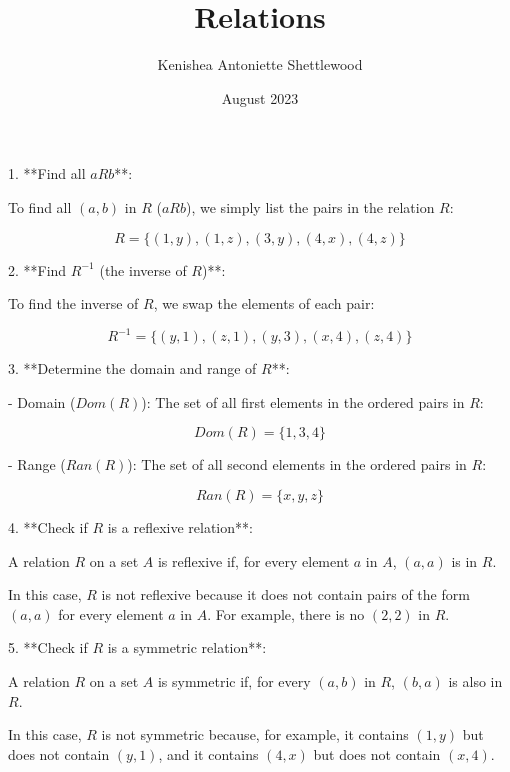 \documentclass{article}
\title{Relations}
\author{Kenishea Antoniette Shettlewood}
\date{August 2023}
\begin{document}
\maketitle

1. **Find all \(a R b\)**:
   
   To find all \((a, b)\) in \(R\) (\(aRb\)), we simply list the pairs in the relation \(R\):

   \[
   R = \{(1, y), (1, z), (3, y), (4, x), (4, z)\}
   \]

2. **Find \(R^{-1}\) (the inverse of \(R\))**:
   
   To find the inverse of \(R\), we swap the elements of each pair:

   \[
   R^{-1} = \{(y, 1), (z, 1), (y, 3), (x, 4), (z, 4)\}
   \]

3. **Determine the domain and range of \(R\)**:
   
   - Domain (\(Dom(R)\)): The set of all first elements in the ordered pairs in \(R\):

   \[
   Dom(R) = \{1, 3, 4\}
   \]

   - Range (\(Ran(R)\)): The set of all second elements in the ordered pairs in \(R\):

   \[
   Ran(R) = \{x, y, z\}
   \]

4. **Check if \(R\) is a reflexive relation**:
   
   A relation \(R\) on a set \(A\) is reflexive if, for every element \(a\) in \(A\), \((a, a)\) is in \(R\).

   In this case, \(R\) is not reflexive because it does not contain pairs of the form \((a, a)\) for every element \(a\) in \(A\). For example, there is no \((2, 2)\) in \(R\).

5. **Check if \(R\) is a symmetric relation**:
   
   A relation \(R\) on a set \(A\) is symmetric if, for every \((a, b)\) in \(R\), \((b, a)\) is also in \(R\).

   In this case, \(R\) is not symmetric because, for example, it contains \((1, y)\) but does not contain \((y, 1)\), and it contains \((4, x)\) but does not contain \((x, 4)\).
\end{document}
